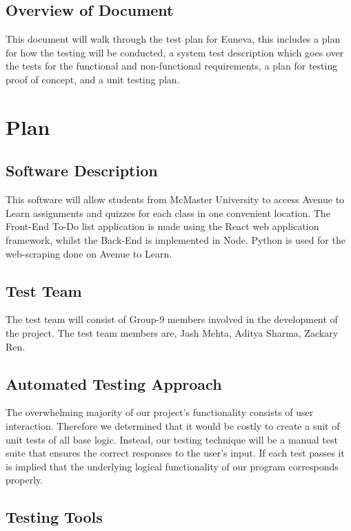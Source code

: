 \documentclass[12pt, titlepage]{article}
\begin{document}
\subsection{Overview of Document}

This document will walk through the test plan for Euneva, this includes a plan for how the testing will be conducted, a system test description which goes over the tests for the functional and non-functional requirements, a plan for testing proof of concept, and a unit testing plan.

\section{Plan}

\subsection{Software Description}

This software will allow students from McMaster University to access Avenue to Learn assignments and quizzes for each class in one convenient location. The Front-End To-Do list application is made using the React web application framework, whilst the Back-End is implemented in Node. Python is used for the web-scraping done on Avenue to Learn.

\subsection{Test Team}

The test team will consist of Group-9 members involved in the development of the project. The test team members are, Jash Mehta, Aditya Sharma, Zackary Ren.

\subsection{Automated Testing Approach}

The overwhelming majority of our project’s functionality consists of user interaction. Therefore we determined that it would be costly to create a suit of unit tests of all base logic. Instead, our testing technique will be a manual test suite that ensures the correct responses to the user’s input. If each test passes it is implied that the underlying logical functionality of our program corresponds properly.

\subsection{Testing Tools}
\end{document}
